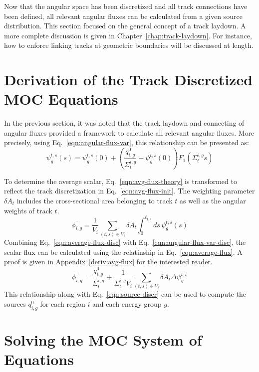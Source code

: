 Now that the angular space has been discretized and all track connections have been defined, all relevant angular fluxes can be calculated from a given source distribution. This section focused on the general concept of a track laydown. A more complete discussion is given in Chapter~\ref{chap:track-laydown}. For instance, how to enforce linking tracks at geometric boundaries will be discussed at length.

\section{Derivation of the Track Discretized MOC Equations}

In the previous section, it was noted that the track laydown and connecting of angular fluxes provided a framework to calculate all relevant angular fluxes. More precisely, using Eq.~\ref{eqn:angular-flux-var}, this relationship can be presented as:
\begin{dmath}
	\psi_g^{t,s}(s) = \psi^{t,s}_g(0) + \left( \frac{q^0_{i,g}}{\Sigma_{t}^{i,g}} - \psi_g^{t,s}(0) \right) F_1\left(\Sigma_{t}^{i,g} s \right)
	\label{eqn:angular-flux-var-disc}
\end{dmath}

To determine the average scalar, Eq.~\ref{eqn:avg-flux-theory} is transformed to reflect the track discretization in Eq.~\ref{eqn:avg-flux-init}. The weighting parameter $\delta A_{t}$ includes the cross-sectional area belonging to track $t$ as well as the angular weights of track $t$.
\begin{dmath}
	\overline{\phi_{i,g}} = \frac{1}{V_i} \sum_{(t,s) \in V_i} \delta A_{t} \int_{0}^{\ell_{t,s}} ds \, \psi^{t,s}_g(s)
	\label{eqn:average-flux-disc}
\end{dmath}
Combining Eq.~\ref{eqn:average-flux-disc} with Eq.~\ref{eqn:angular-flux-var-disc}, the scalar flux can be calculated using the relatinship in Eq.~\ref{eqn:average-flux}. A proof is given in Appendix~\ref{deriv:avg-flux} for the interested reader.
\begin{dmath}
	\overline{\phi_{i,g}} = \frac{q^0_{i,g}}{\Sigma_{t}^{i,g}} + \frac{1}{\Sigma_{t}^{i,g} V_i} \sum_{(t,s) \in V_i} \delta A_{t} \Delta \psi_g^{t,s}
	\label{eqn:average-flux}
\end{dmath}
This relationship along with Eq.~\ref{eqn:source-discr} can be used to compute the sources $q^0_{i,g}$ for each region $i$ and each energy group $g$.


\section{Solving the MOC System of Equations}

